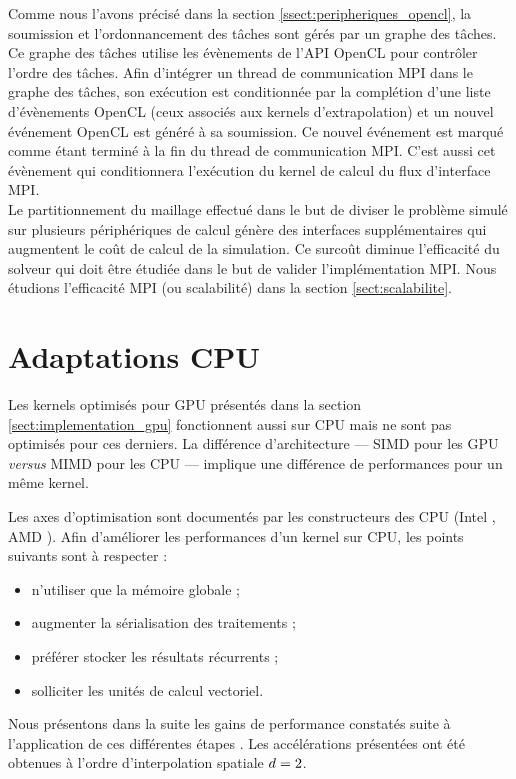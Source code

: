 Comme nous l'avons précisé dans la section \ref{ssect:peripheriques_opencl},
la soumission et l'ordonnancement des tâches
sont gérés par un graphe des tâches.
Ce graphe des tâches utilise les évènements de l'API OpenCL pour
contrôler l'ordre des tâches.
Afin d'intégrer un thread de communication MPI dans le graphe des tâches,
son exécution est conditionnée par la complétion d'une liste d'évènements OpenCL (ceux associés aux kernels d'extrapolation)
et un nouvel événement OpenCL est généré à sa soumission. Ce nouvel événement
est marqué comme étant terminé à la fin du thread de communication MPI.
C'est aussi cet évènement qui conditionnera l'exécution du
kernel de calcul du flux d'interface MPI.
\\




Le partitionnement du maillage effectué dans le but de diviser le problème
simulé sur plusieurs périphériques de calcul génère des interfaces
supplémentaires qui augmentent le coût de calcul de la simulation.
Ce surcoût diminue l'efficacité du solveur qui doit être étudiée
dans le but de valider l'implémentation MPI.
Nous étudions l'efficacité MPI (ou scalabilité) dans la section
\ref{sect:scalabilite}.
\\


\section{Adaptations CPU}
\label{sect:adaptation_cpu}


Les kernels optimisés pour GPU présentés dans la section
\ref{sect:implementation_gpu} fonctionnent aussi sur CPU mais ne sont
pas optimisés pour ces derniers.
La différence d'architecture --- SIMD pour les GPU \textit{versus}
MIMD pour les CPU --- implique une différence de performances
pour un même kernel.

Les axes d'optimisation sont documentés par les constructeurs
des CPU (Intel \cite{intelsdkguide}, AMD \cite{amdsdkguide}). Afin d'améliorer les performances d'un kernel
sur CPU, les points suivants sont à respecter :
\begin{itemize}
	\item n'utiliser que la mémoire globale ;
	\item augmenter la sérialisation des traitements ;
	\item préférer stocker les résultats récurrents ;
	\item solliciter les unités de calcul vectoriel.
\end{itemize}
Nous présentons dans la suite les gains de performance constatés
suite à l'application de ces différentes étapes \cite{weber:hal-01666352}.
Les accélérations présentées ont été obtenues à l'ordre d'interpolation
spatiale $d=2$.

